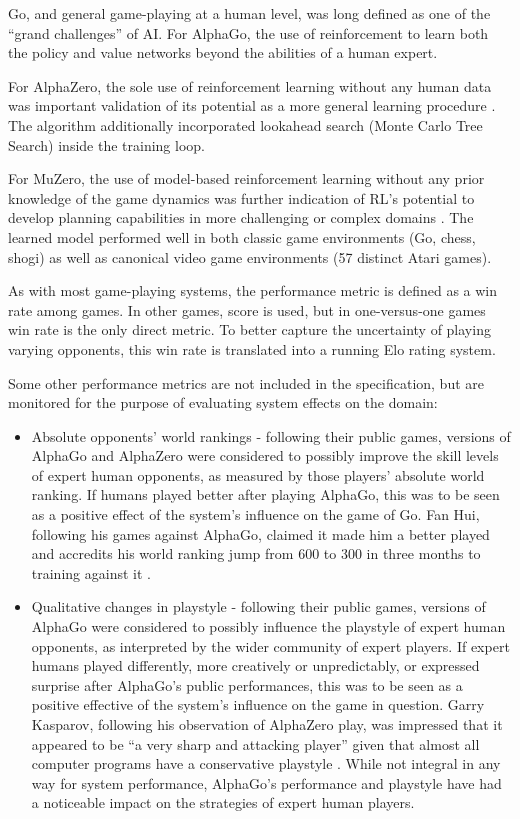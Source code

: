 \documentclass[12pt, a4paper, twocolumn]{article}
\begin{document}
\OptIntent
{Go, and general game-playing at a human level, was long defined as one of the ``grand challenges'' of AI. 
For AlphaGo, the use of reinforcement to learn both the policy and value networks beyond the abilities of a human expert. %

For AlphaZero, the sole use of reinforcement learning without any human data was important validation of its potential as a more general learning procedure \cite{silver2017mastering}.
The algorithm additionally incorporated lookahead search (Monte Carlo Tree Search) inside the training loop.

For MuZero, the use of model-based reinforcement learning without any prior knowledge of the game dynamics was further indication of RL's potential to develop planning capabilities in more challenging or complex domains \cite{schrittwieser2020mastering}.
The learned model performed well in both classic game environments (Go, chess, shogi) as well as canonical video game environments (57 distinct Atari games).}
{As with most game-playing systems, the performance metric is defined as a win rate among games.
In other games, score is used, but in one-versus-one games win rate is the only direct metric.
To better capture the uncertainty of playing varying opponents, this win rate is translated into a running Elo rating system.}
{Some other performance metrics are not included in the specification, but are monitored for the purpose of evaluating system effects on the domain:

\begin{itemize}
    \item Absolute opponents' world rankings - following their public games, versions of AlphaGo and AlphaZero were considered to possibly improve the skill levels of expert human opponents, as measured by those players' absolute world ranking.
    If humans played better after playing AlphaGo, this was to be seen as a positive effect of the system's influence on the game of Go.
    Fan Hui, following his games against AlphaGo, claimed it made him a better played and accredits his world ranking jump from 600 to 300 in three months to training against it \cite{fan}.
    \item Qualitative changes in playstyle - following their public games, versions of AlphaGo were considered to possibly  influence the playstyle of expert human opponents, as interpreted by the wider community of expert players.
    If expert humans played differently, more creatively or unpredictably, or expressed surprise after AlphaGo's public performances, this was to be seen as a positive effective of the system's influence on the game in question.
    Garry Kasparov, following his observation of AlphaZero play, was impressed that it appeared to be ``a very sharp and attacking player'' given that almost all computer programs have a conservative playstyle \cite{kasparov}.
    While not integral in any way for system performance, AlphaGo's performance and playstyle have had a noticeable impact on the strategies of expert human players.
\end{itemize}}
\end{document}
